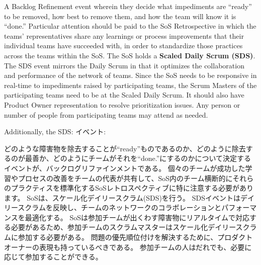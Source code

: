 \documentclass[12pt,a4paper,parskip=full]{scrartcl}
\begin{document}
A Backlog Refinement event wherein they decide what impediments are ``ready'' to be removed, how best to remove them, and how the team will know it is ``done.''
Particular attention should be paid to the SoS Retrospective in which the teams' representatives share any learnings or process improvements that their individual teams have succeeded with, in order to standardize those practices across the teams within the SoS.
The SoS holds a \textbf{Scaled Daily Scrum (SDS)}. The SDS event mirrors the Daily Scrum in that it optimizes the collaboration and performance of the network of teams. Since the SoS needs to be responsive in real-time to impediments raised by participating teams, the Scrum Masters of the participating teams need to be at the Scaled Daily Scrum. It should also have Product Owner representation to resolve prioritization issues. Any person or number of people from participating teams may attend as needed.

Additionally, the SDS:
\fi
イベント:

どのような障害物を除去することが``ready''ものであるのか、どのように除去するのが最善か、どのようにチームがそれを``done.''にするのかについて決定するイベントが、バックログリファインメントである。
個々のチームが成功した学習やプロセスの改善をチームの代表が共有して、SoS内のチーム横断的にそれらのプラクティスを標準化するSoSレトロスペクティブに特に注意する必要があります。
SoSは、スケール化デイリースクラム(SDS)を行う。
SDSイベントはデイリースクラムを反映し、チームのネットワークのコラボレーションとパフォーマンスを最適化する。
SoSは参加チームが出くわす障害物にリアルタイムで対応する必要があるため、参加チームのスクラムマスターはスケール化デイリースクラムに参加する必要がある。
問題の優先順位付けを解決するために、プロダクトオーナーの表現も持っているべきである。
参加チームの人はだれでも、必要に応じて参加することができる。
\end{document}
